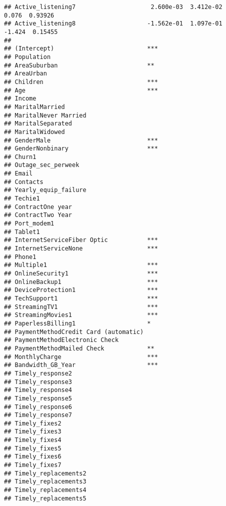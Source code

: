 \documentclass[
]{article}
\begin{document}
\begin{verbatim}
## Active_listening7                     2.600e-03  3.412e-02     0.076  0.93926
## Active_listening8                    -1.562e-01  1.097e-01    -1.424  0.15455
##                                         
## (Intercept)                          ***
## Population                              
## AreaSuburban                         ** 
## AreaUrban                               
## Children                             ***
## Age                                  ***
## Income                                  
## MaritalMarried                          
## MaritalNever Married                    
## MaritalSeparated                        
## MaritalWidowed                          
## GenderMale                           ***
## GenderNonbinary                      ***
## Churn1                                  
## Outage_sec_perweek                      
## Email                                   
## Contacts                                
## Yearly_equip_failure                    
## Techie1                                 
## ContractOne year                        
## ContractTwo Year                        
## Port_modem1                             
## Tablet1                                 
## InternetServiceFiber Optic           ***
## InternetServiceNone                  ***
## Phone1                                  
## Multiple1                            ***
## OnlineSecurity1                      ***
## OnlineBackup1                        ***
## DeviceProtection1                    ***
## TechSupport1                         ***
## StreamingTV1                         ***
## StreamingMovies1                     ***
## PaperlessBilling1                    *  
## PaymentMethodCredit Card (automatic)    
## PaymentMethodElectronic Check           
## PaymentMethodMailed Check            ** 
## MonthlyCharge                        ***
## Bandwidth_GB_Year                    ***
## Timely_response2                        
## Timely_response3                        
## Timely_response4                        
## Timely_response5                        
## Timely_response6                        
## Timely_response7                        
## Timely_fixes2                           
## Timely_fixes3                           
## Timely_fixes4                           
## Timely_fixes5                           
## Timely_fixes6                           
## Timely_fixes7                           
## Timely_replacements2                    
## Timely_replacements3                    
## Timely_replacements4                    
## Timely_replacements5                    

\end{verbatim}
\end{document}
